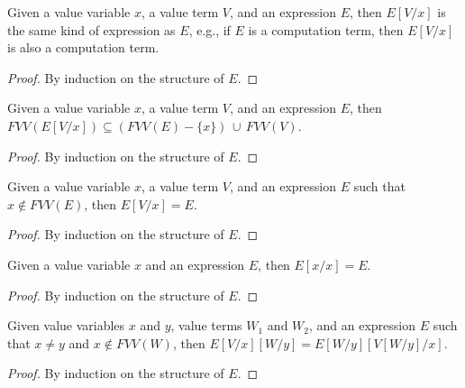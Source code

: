 \begin{proposition}
Given a value variable $x$, a value term $V$, and an expression $E$, then $E[V/x]$ is the same kind of expression as $E$, e.g., if $E$ is a computation term, then  $E[V/x]$ is also a computation term.
\end{proposition}

\begin{proof}
By induction on the structure of $E$.
\end{proof}

\begin{proposition}
\label{prop:freevariablesofsubsstitution}
Given a value variable $x$, a value term $V$, and an expression $E$, then $FVV(E[V/x]) \subseteq (FVV(E) - \{x\}) \,\cup\, FVV(V)$.
\end{proposition}

\begin{proof}
By induction on the structure of $E$.
\end{proof}


\begin{proposition}
\label{prop:valuesubstlemma1}
Given a value variable $x$, a value term $V$, and an expression $E$ such that $x \not\in FVV(E)$, then $E[V/x] = E$.
\end{proposition}

\begin{proof}
By induction on the structure of $E$.
\end{proof}

\begin{proposition}
\label{prop:valuesubstlemma2}
Given a value variable $x$ and an expression $E$, then $E[x/x] = E$.
\end{proposition}

\begin{proof}
By induction on the structure of $E$.
\end{proof}

\begin{proposition}
\label{prop:valuesubstlemma3}
Given value variables $x$ and $y$, value terms $W_1$ and $W_2$, and an expression $E$ such that $x \neq y$ and $x \not\in FVV(W)$, then $E[V/x][W/y] = E[W/y][V[W/y]/x]$.
\end{proposition}

\begin{proof}
By induction on the structure of $E$.
\end{proof}


